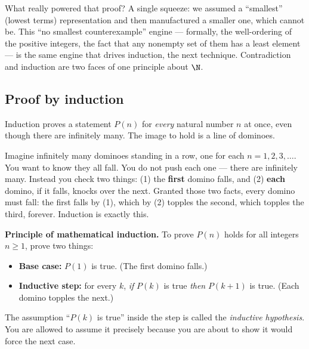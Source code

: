 \begin{happeningbox}
What really powered that proof? A single squeeze: we assumed a ``smallest'' (lowest
terms) representation and then manufactured a smaller one, which cannot be. This
``no smallest counterexample'' engine --- formally, the well-ordering of the
positive integers, the fact that any nonempty set of them has a least element ---
is the same engine that drives induction, the next technique. Contradiction and
induction are two faces of one principle about $\N$.
\end{happeningbox}

\subsection{Proof by induction}

Induction proves a statement $P(n)$ for \emph{every} natural number $n$ at once,
even though there are infinitely many. The image to hold is a line of dominoes.

\begin{intuitionbox}
Imagine infinitely many dominoes standing in a row, one for each $n=1,2,3,\dots$.
You want to know they all fall. You do not push each one --- there are infinitely
many. Instead you check two things: (1) the \textbf{first} domino falls, and
(2) \textbf{each} domino, if it falls, knocks over the next. Granted those two
facts, every domino must fall: the first falls by (1), which by (2) topples the
second, which topples the third, forever. Induction is exactly this.
\end{intuitionbox}

\begin{focusbox}
\textbf{Principle of mathematical induction.} To prove $P(n)$ holds for all
integers $n \ge 1$, prove two things:
\begin{itemize}
  \item \textbf{Base case:} $P(1)$ is true. (The first domino falls.)
  \item \textbf{Inductive step:} for every $k$, \emph{if} $P(k)$ is true \emph{then}
        $P(k+1)$ is true. (Each domino topples the next.)
\end{itemize}
The assumption ``$P(k)$ is true'' inside the step is called the \emph{inductive
hypothesis}. You are allowed to assume it precisely because you are about to show
it would force the next case.
\end{focusbox}

